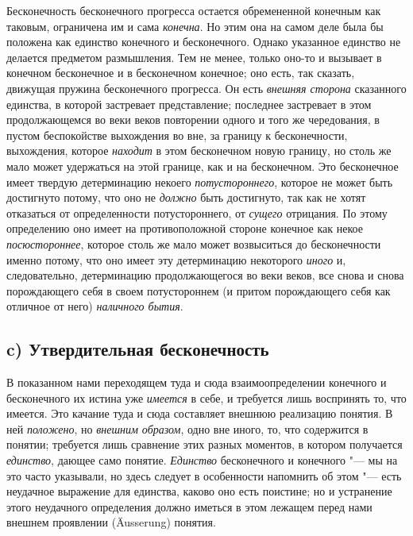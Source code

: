 Бесконечность бесконечного прогресса остается обремененной конечным как
таковым, ограничена им и сама {\em конечна}. Но этим
она на самом деле была бы положена как единство конечного и бесконечного.
Однако указанное единство не делается предметом размышления. Тем не менее,
только оно-то и вызывает в конечном бесконечное и в бесконечном конечное;
оно есть, так сказать, движущая пружина бесконечного прогресса. Он есть
{\em внешняя сторона} сказанного единства, в которой
застревает представление; последнее застревает в этом продолжающемся во
веки веков повторении одного и того же чередования, в пустом беспокойстве
выхождения во вне, за границу к бесконечности, выхождения, которое
{\em находит} в этом бесконечном новую границу, но
столь же мало может удержаться на этой границе, как и на бесконечном. Это
бесконечное имеет твердую детерминацию некоего
{\em потустороннего}, которое не может быть достигнуто
потому, что оно не {\em должно} быть достигнуто, так
как не хотят отказаться от определенности потустороннего, от
{\em сущего} отрицания. По этому определению оно имеет
на противоположной стороне конечное как некое
{\em посюстороннее}, которое столь же мало может
возвыситься до бесконечности именно потому, что оно имеет эту детерминацию
некоторого {\em иного} и, следовательно, детерминацию
продолжающегося во веки веков, все снова и снова порождающего себя в своем
потустороннем (и притом порождающего себя как отличное от него)
{\em наличного бытия}.

\subsection[c) Утвердительная бесконечность]{c) Утвердительная бесконечность}
В показанном нами переходящем туда и сюда взаимоопределении конечного и
бесконечного их истина уже {\em имеется} в себе, и
требуется лишь воспринять то, что имеется. Это качание туда и сюда
составляет внешнюю реализацию понятия. В ней
{\em положено}, но {\em внешним
образом}, одно вне иного, то, что содержится в понятии; требуется лишь
сравнение этих разных моментов, в котором получается
{\em единство}, дающее само понятие.
{\em Единство} бесконечного и конечного "--- мы на это
часто указывали, но здесь следует в особенности напомнить об этом "--- есть
неудачное выражение для единства, каково оно есть поистине; но и устранение
этого неудачного определения должно иметься в этом лежащем перед нами
внешнем проявлении (Äusserung) понятия.

